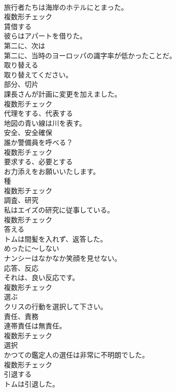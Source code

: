 \documentclass[8pt]{extreport}
\begin{document}
\begin{CJK}{UTF8}{min}
\\	旅行者たちは海岸のホテルにとまった。	
\\	複数形チェック
\\	[動詞]	賃借する	
\\	彼らはアパートを借りた。	
\\	[副詞]	第二に、次は	
\\	第二に、当時のヨーロッパの識字率が低かったことだ。	
\\	[動詞]	取り替える	
\\	取り替えてください。	
\\	[名詞]	部分、切片	
\\	課長さんが計画に変更を加えました。	
\\	複数形チェック
\\	[動詞]	代理をする、代表する	
\\	地図の青い線は川を表す。	
\\	[名詞]	安全、安全確保	
\\	誰か警備員を呼べる？	
\\	複数形チェック
\\	[動詞]	要求する、必要とする	
\\	お力添えをお願いいたします。	
\\	[名詞]	種	
\\	複数形チェック
\\	[名詞]	調査、研究	
\\	私はエイズの研究に従事している。	
\\	複数形チェック
\\	[動詞]	答える	
\\	トムは間髪を入れず、返答した。	
\\	[副詞]	めったに〜しない	
\\	ナンシーはなかなか笑顔を見せない。	
\\	[名詞]	応答、反応	
\\	それは、良い反応です。	
\\	複数形チェック
\\	[動詞]	選ぶ	
\\	クリスの行動を選択して下さい。	
\\	[名詞]	責任、責務	
\\	連帯責任は無責任。	
\\	複数形チェック
\\	[名詞]	選択	
\\	かつての鑑定人の選任は非常に不明朗でした。	
\\	複数形チェック
\\	[動詞]	引退する	
\\	トムは引退した。	

\end{CJK}
\end{document}
